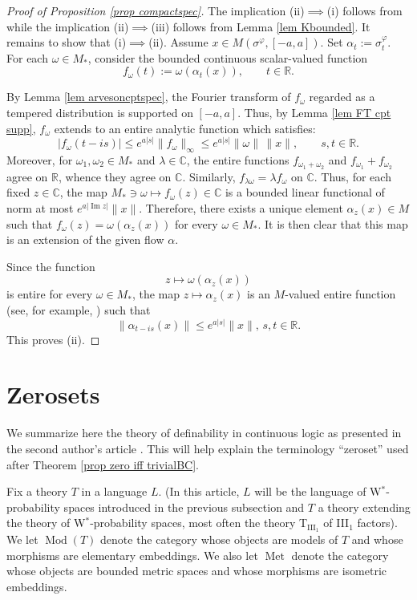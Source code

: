 \documentclass[12pt]{amsart}
\theoremstyle{definition}
\newcommand{\C}{\mathbb{C}}
\begin{document}
\begin{proof}[Proof of Proposition \ref{prop compactspec}] The implication (ii)$\implies$(i) follows from \cite[Lemma 2.5]{haagerup87} while the implication (ii)$\implies$(iii) follows from Lemma \ref{lem Kbounded}. It remains to show that (i)$\implies$(ii). 
    Assume $x\in M(\sigma^{\varphi},[-a,a])$.
Set $\alpha_t:=\sigma_t^\varphi$. For each $\omega\in M_*$, consider 
the bounded continuous scalar-valued function
\[
f_{\omega}(t):=\omega(\alpha_t(x)), \qquad t\in\mathbb R.
\]

By Lemma \ref{lem arvesoncptspec}, the Fourier transform of $f_{\omega}$ regarded as a tempered distribution is supported on $[-a,a]$. Thus, by Lemma \ref{lem FT cpt supp}, $f_{\omega}$ extends to an entire analytic function which satisfies:
\[
|f_\omega(t-is)|\le e^{a|s|}\|f_\omega\|_\infty
\le e^{a|s|}\|\omega\|\,\|x\|,
\qquad s,t\in\mathbb R.
\]
Moreover, for $\omega_1,\omega_2\in M_*$ and $\lambda \in \mathbb{C}$, the entire functions $f_{\omega_1+\omega_2}$ and $f_{\omega_1}+f_{\omega_2}$ agree on $\mathbb{R}$, whence they agree on $\mathbb{C}$. Similarly, $f_{\lambda \omega}=\lambda f_{\omega}$ on $\mathbb{C}$.  Thus, for each fixed $z\in \mathbb{C}$, the map $M_*\ni \omega\mapsto f_{\omega}(z)\in \C$ is a bounded linear functional of norm at most $e^{a|\operatorname{Im} z|}\|x\|$. Therefore, there exists a unique element $\alpha_z(x)\in M$ such that $f_{\omega}(z)=\omega(\alpha_z(x))$ for every $\omega\in M_*$. It is then clear that this map is an extension of the given flow $\alpha$. 

Since the function
\[
z\mapsto \omega(\alpha_z(x))
\]
is entire for every $\omega\in M_*$, the map $z\mapsto \alpha_z(x)$ is an $M$-valued entire function (see, for example, \cite[Appendix A.\,1]{takesakiII}) such that 
\[\|\alpha_{t-is}(x)\|\le e^{a|s|}\|x\|,\,s,t\in \mathbb{R}.\]
This proves (ii). 
\end{proof}

\section{Zerosets}\label{definabilitysection}

We summarize here the theory of definability in continuous logic as presented in the second author's article \cite{goldbringspectralgap}.  This will help explain the terminology ``zeroset'' used after Theorem \ref{prop zero iff trivialBC}.

Fix a theory $T$ in a language $L$.  (In this article, $L$ will be the language of W$^*$-probability spaces introduced in the previous subsection and $T$ a theory extending the theory of W$^*$-probability spaces, most often the theory T$_{\mathrm{III}_1}$ of III$_1$ factors).  We let $\operatorname{Mod}(T)$ denote the category whose objects are models of $T$ and whose morphisms are elementary embeddings.  We also let $\operatorname{Met}$ denote the category whose objects are bounded metric spaces and whose morphisms are isometric embeddings.
\end{document}
